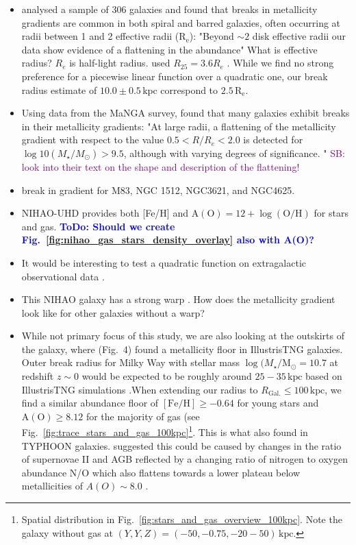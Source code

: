 \documentclass[fleqn,usenatbib]{mnras}
\newcommand{\ToDo}[1]{\textbf{\textcolor{blue}{ToDo: #1}}}
\newcommand{\SB}[1]{{\textcolor{purple}{SB: #1}}}
\begin{document}
\begin{itemize}
    \item \citet{Sanchez2014} analysed a sample of 306 galaxies and found that breaks in metallicity gradients are common in both spiral and barred galaxies, often occurring at radii between 1 and 2 effective radii ($\mathrm{R_e}$): "Beyond $\sim 2$ disk effective radii our data show evidence of a flattening in the abundance" What is effective radius? $R_e$ is half-light radius. \citet{Chen2023} used $R_{25} = 3.6 R_e$ \citep{Williams2009}. While we find no strong preference for a piecewise linear function over a quadratic one, our break radius estimate of $10.0 \pm 0.5\,\mathrm{kpc}$ correspond to $2.5\,\mathrm{R_e}$.
    \item Using data from the MaNGA survey, \citet{Belfiore2017} found that many galaxies exhibit breaks in their metallicity gradients: "At large radii, a flattening of the metallicity gradient with respect to the value $0.5 < R/R_e < 2.0$ is detected for $\log10(M_\star/M_\odot) > 9.5$, although with varying degrees of significance. " \SB{look into their text on the shape and description of the flattening!}
    \item \citet{Bresolin2012} break in gradient for M83, NGC 1512, NGC3621, and NGC4625.
    \item NIHAO-UHD provides both [Fe/H] and $\mathrm{A(O)} = 12 + \log(\mathrm{O/H})$ for stars and gas. \ToDo{Should we create Fig.~\ref{fig:nihao_gas_stars_density_overlay} also with A(O)?}
    \item It would be interesting to test a quadratic function on extragalactic observational data \citep[e.g.][]{Chen2023, Bresolin2012}.
    \item This NIHAO galaxy has a strong warp \citep[compared to other NIHAO-UHD simulations][]{Buck2020}. How does the metallicity gradient look like for other galaxies without a warp?
    \item While not primary focus of this study, we are also looking at the outskirts of the galaxy, where \citet{Garcia2023} (Fig.~4) found a metallicity floor in IllustrisTNG galaxies. Outer break radius for Milky Way with stellar mass $\log(M_\star/\mathrm{M_\odot} = 10.7$ \citep{BlandHawthorn_Gerhard2016} at redshift $z \sim 0$ would be expected to be roughly around $25-35\,\mathrm{kpc}$ based on IllustrisTNG simulations \citep[][their Appendix A]{Garcia2023}.When extending our radius to $R_\mathrm{Gal.} \leq 100\,\mathrm{kpc}$, we find a similar abundance floor of $\mathrm{[Fe/H]} \geq -0.64$ for young stars and $\mathrm{A(O)} \geq 8.12$ for the majority of gas (see Fig.~\ref{fig:trace_stars_and_gas_100kpc}\footnote{Spatial distribution in Fig.~\ref{fig:stars_and_gas_overview_100kpc}. Note the galaxy without gas at $(Y,Y,Z) = (-50,-0.75,-20-50)\,\mathrm{kpc}$.}. This is what \citet{Grasha2022} also found in TYPHOON galaxies. \citet{Grasha2022} suggested this could be caused by changes in the ratio of supernovae II and AGB reflected by a changing ratio of nitrogen to oxygen abundance N/O which also flattens towards a lower plateau below metallicities of $A(O) \sim 8.0$ \citep{Nicholls2017}.

\end{itemize}
\end{document}
